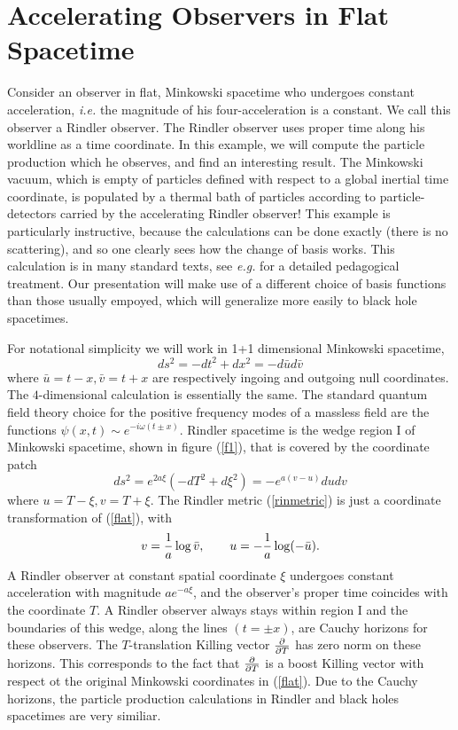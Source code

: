 \documentclass[12pt]{article}
\newcommand{\be}{\begin{equation}}
\newcommand{\ee}{\end{equation}}
\newcommand{\sectiono}[1]{\section{#1}\setcounter{equation}{0}}
\def\ub{\bar u}
\def\vb{\bar v}
\begin{document}
\sectiono{Accelerating Observers in Flat Spacetime}

Consider an  observer in flat, Minkowski spacetime who undergoes
constant acceleration, {\it i.e.} the magnitude of his four-acceleration is
a constant.
We call this observer a Rindler observer.
The Rindler observer uses proper time along his worldline as a time coordinate.
In this example, we will compute the particle production which he observes,
and find an interesting result. The Minkowski vacuum, which is empty of
particles defined with respect to a global inertial time coordinate,
is populated by a thermal bath of particles according to particle-detectors
carried by the accelerating Rindler observer! This example is particularly instructive,
because the calculations can be done exactly (there is no scattering), and
so one clearly sees how the change of basis works.  This calculation
is in many standard texts, see {\it e.g.} \cite{bad} for a detailed pedagogical
treatment.  Our presentation will make use of a different
choice of basis functions than those usually empoyed, which will generalize more
easily to black hole spacetimes.

For notational simplicity we will work in 1+1 dimensional Minkowski
spacetime,
%
\be\label{flat}ds^2 = - dt^2 +dx^2 = -d\ub  d\vb \ee
%
where $\ub =t-x ,\vb =t+x$ are respectively ingoing and outgoing null
coordinates.
The $4$-dimensional calculation is essentially the same.
The standard quantum field theory choice for the positive
frequency modes of a massless field are the functions $\psi (x,t)\sim
e^{-i\omega (t\pm x)}$.
Rindler spacetime is the wedge region I of Minkowski spacetime, shown in
figure (\ref{f1}), that is covered
by the coordinate patch
%
\be\label{rinmetric}ds^2 =e^{2a\xi }(-dT^2 +d\xi ^2) =-e^{a(v-u)} dudv\ee
%
where $u=T-\xi , v=T+\xi$.  The Rindler metric (\ref{rinmetric}) is just a
coordinate
transformation of (\ref{flat}), with
%
\be\label{rincoord}v= {1\over a}\log\vb, \qquad  u=-{1\over a}\log (-\ub).\ee
%
A Rindler observer at constant spatial coordinate $\xi$ undergoes
constant acceleration with magnitude $ae^{ -a\xi }$, and the observer's proper
time coincides with the coordinate $T$.
A Rindler observer always stays within region I and
the boundaries of this wedge, along the lines $(t=\pm x)$, are
Cauchy horizons for these observers.
The $T$-translation Killing vector
${\partial\over\partial T}$
has zero norm on these horizons.  This corresponds to the fact that
${\partial\over\partial T}$ is a boost
Killing vector with respect ot the original Minkowski coordinates in
(\ref{flat}). Due to the
Cauchy horizons, the particle production calculations in Rindler and black
holes spacetimes
are very similiar.
\end{document}
